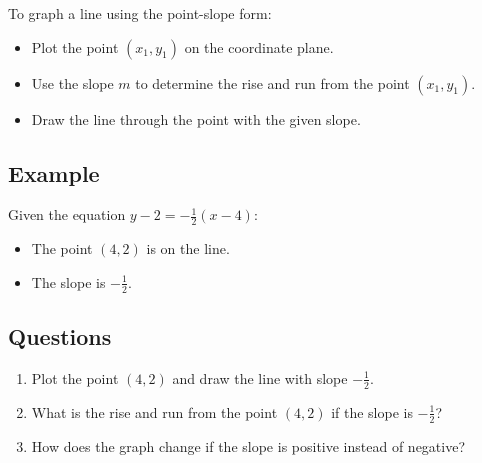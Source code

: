 \documentclass[12pt]{article}
\begin{document}
To graph a line using the point-slope form:
\begin{itemize}
    \item Plot the point \((x_1, y_1)\) on the coordinate plane.
    \item Use the slope \(m\) to determine the rise and run from the point \((x_1, y_1)\).
    \item Draw the line through the point with the given slope.
\end{itemize}

\subsection*{Example}

Given the equation \(y - 2 = -\frac{1}{2}(x - 4)\):
\begin{itemize}
    \item The point \((4, 2)\) is on the line.
    \item The slope is \(-\frac{1}{2}\).
\end{itemize}

\begin{center}
\end{center}

\subsection*{Questions}
\begin{enumerate}
    \item Plot the point \((4, 2)\) and draw the line with slope \(-\frac{1}{2}\).
    \item What is the rise and run from the point \((4, 2)\) if the slope is \(-\frac{1}{2}\)?
    \item How does the graph change if the slope is positive instead of negative?
\end{enumerate}
\end{document}
